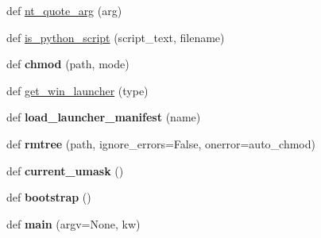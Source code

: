 \begin{DoxyCompactItemize}
\item 
def \hyperlink{namespacesetuptools_1_1command_1_1easy__install_a663991ed6ab4d76d408857552e043e8c}{nt\+\_\+quote\+\_\+arg} (arg)
\item 
def \hyperlink{namespacesetuptools_1_1command_1_1easy__install_a6dd384c4f3471ae5d2480ccef58bb8e9}{is\+\_\+python\+\_\+script} (script\+\_\+text, filename)
\item 
\mbox{\label{namespacesetuptools_1_1command_1_1easy__install_a666df55c05e45cc268e342c515c1119c}} 
def {\bfseries chmod} (path, mode)
\item 
def \hyperlink{namespacesetuptools_1_1command_1_1easy__install_ac8a1f99006fa5280139c286ec6d3e782}{get\+\_\+win\+\_\+launcher} (type)
\item 
\mbox{\label{namespacesetuptools_1_1command_1_1easy__install_a5955dddc6fc2c08a06edda8964b2b97a}} 
def {\bfseries load\+\_\+launcher\+\_\+manifest} (name)
\item 
\mbox{\label{namespacesetuptools_1_1command_1_1easy__install_afb28853ce5af8986b0a4dbf9a38cc732}} 
def {\bfseries rmtree} (path, ignore\+\_\+errors=False, onerror=auto\+\_\+chmod)
\item 
\mbox{\label{namespacesetuptools_1_1command_1_1easy__install_a0de286231358ef770b15f22383db6d4c}} 
def {\bfseries current\+\_\+umask} ()
\item 
\mbox{\label{namespacesetuptools_1_1command_1_1easy__install_a7720edd0a0e34c174bd65a717b0b559c}} 
def {\bfseries bootstrap} ()
\item 
\mbox{\label{namespacesetuptools_1_1command_1_1easy__install_a5bd817906d2ef65cd7fa6fd466a45fca}} 
def {\bfseries main} (argv=None, kw)
\end{DoxyCompactItemize}
